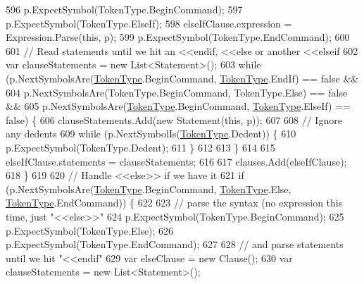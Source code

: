 \begin{DoxyCode}
596                     p.ExpectSymbol(TokenType.BeginCommand);
597                     p.ExpectSymbol(TokenType.ElseIf);
598                     elseIfClause.expression = Expression.Parse(\textcolor{keyword}{this}, p);
599                     p.ExpectSymbol(TokenType.EndCommand);
600 
601                     \textcolor{comment}{// Read statements until we hit an <<endif, <<else or another <<elseif}
602                     var clauseStatements = \textcolor{keyword}{new} List<Statement>();
603                     \textcolor{keywordflow}{while} (p.NextSymbolsAre(\hyperlink{a00045_a301aa7c866593a5b625a8fc158bbeace}{TokenType}.BeginCommand, 
      \hyperlink{a00045_a301aa7c866593a5b625a8fc158bbeace}{TokenType}.EndIf) == \textcolor{keyword}{false} &&
604                         p.NextSymbolsAre(TokenType.BeginCommand, TokenType.Else) == \textcolor{keyword}{false} &&
605                         p.NextSymbolsAre(\hyperlink{a00045_a301aa7c866593a5b625a8fc158bbeace}{TokenType}.BeginCommand, 
      \hyperlink{a00045_a301aa7c866593a5b625a8fc158bbeace}{TokenType}.ElseIf) == \textcolor{keyword}{false}) \{
606                         clauseStatements.Add(\textcolor{keyword}{new} Statement(\textcolor{keyword}{this}, p));
607 
608                         \textcolor{comment}{// Ignore any dedents}
609                         \textcolor{keywordflow}{while} (p.NextSymbolIs(\hyperlink{a00045_a301aa7c866593a5b625a8fc158bbeace}{TokenType}.Dedent)) \{
610                             p.ExpectSymbol(TokenType.Dedent);
611                         \}
612 
613                     \}
614 
615                     elseIfClause.statements = clauseStatements;
616 
617                     clauses.Add(elseIfClause);
618                 \}
619 
620                 \textcolor{comment}{// Handle <<else>> if we have it}
621                 \textcolor{keywordflow}{if} (p.NextSymbolsAre(\hyperlink{a00045_a301aa7c866593a5b625a8fc158bbeace}{TokenType}.BeginCommand, \hyperlink{a00045_a301aa7c866593a5b625a8fc158bbeace}{TokenType}.Else, 
      \hyperlink{a00045_a301aa7c866593a5b625a8fc158bbeace}{TokenType}.EndCommand)) \{
622 
623                     \textcolor{comment}{// parse the syntax (no expression this time, just "<<else>>"}
624                     p.ExpectSymbol(TokenType.BeginCommand);
625                     p.ExpectSymbol(TokenType.Else);
626                     p.ExpectSymbol(TokenType.EndCommand);
627 
628                     \textcolor{comment}{// and parse statements until we hit "<<endif"}
629                     var elseClause = \textcolor{keyword}{new} Clause();
630                     var clauseStatements = \textcolor{keyword}{new} List<Statement>();

\end{DoxyCode}
